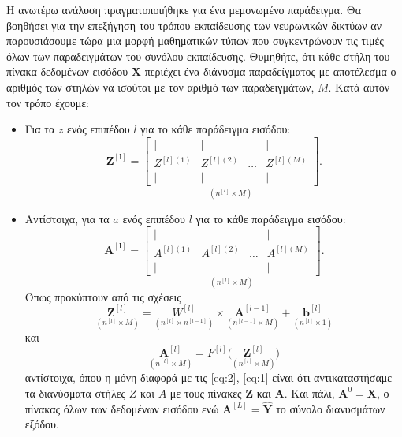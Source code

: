 Η ανωτέρω ανάλυση πραγματοποιήθηκε για ένα μεμονωμένο παράδειγμα. Θα βοηθήσει για την επεξήγηση του τρόπου εκπαίδευσης των νευρωνικών δικτύων αν παρουσιάσουμε τώρα μια μορφή μαθηματικών τύπων που συγκεντρώνουν τις τιμές όλων των παραδειγμάτων του συνόλου εκπαίδευσης. Θυμηθήτε, ότι κάθε στήλη του πίνακα δεδομένων εισόδου $\boldsymbol{X}$ περιέχει ένα διάνυσμα παραδείγματος με αποτέλεσμα ο αριθμός των στηλών να ισούται με τον αριθμό των παραδειγμάτων, $M$. Κατά αυτόν τον τρόπο έχουμε:
\begin{itemize}
  \item Για τα $z$ ενός επιπέδου $l$ για το κάθε παράδειγμα εισόδου:
  \begin{equation}
    \boldsymbol{Z^{[l]}} =
    \underset{(n^{[l]} \times M)}{\begin{bmatrix}
        |&|&&| \\
        Z^{[l](1)} & Z^{[l](2)} & \dots & Z^{[l](M)}\\
        |&|&&|
    \end{bmatrix}}.
  \end{equation}
  \item Αντίστοιχα, για τα $a$ ενός επιπέδου $l$ για το κάθε παράδειγμα εισόδου:
  \begin{equation}
    \boldsymbol{A^{[l]}} =
    \underset{(n^{[l]} \times M)}{\begin{bmatrix}
        |&|&&| \\
        A^{[l](1)} & A^{[l](2)} & \dots & A^{[l](M)}\\
        |&|&&|
    \end{bmatrix}}.
  \end{equation}
  Όπως προκύπτουν από τις σχέσεις 
  \begin{equation}\label{eq:_fw_z}
    \underset{(n^{[l]} \times M)}{\boldsymbol{Z}^{[l]}} = \underset{(n^{[l]} \times n^{[l-1]})}{W^{[l]}} \times \underset{(n^{[l-1]} \times M)}{\boldsymbol{A}^{[l-1]}} + \underset{(n^{[l]} \times 1)}{\boldsymbol{b}^{[l]}}
  \end{equation}
   και 
  \begin{equation}\label{eq:fw_a}
    \underset{(n^{[l]} \times M)}{\boldsymbol{A}^{[l]}} = F^{[l]}\big(\underset{(n^{[l]} \times M)}{\boldsymbol{Z}^{[l]}}\big)
  \end{equation} 
  αντίστοιχα, όπου η μόνη διαφορά με τις \ref{eq:2}, \ref{eq:1} είναι ότι αντικαταστήσαμε τα διανύσματα στήλες $Z$ και $A$ με τους πίνακες $\boldsymbol{Z}$ και $\boldsymbol{A}$. Και πάλι, $\boldsymbol{A}^{0} = \boldsymbol{X}$, ο πίνακας όλων των δεδομένων εισόδου ενώ $\boldsymbol{A}^{[L]} = \boldsymbol{\hat{Y}}$ το σύνολο διανυσμάτων εξόδου.
\end{itemize}

